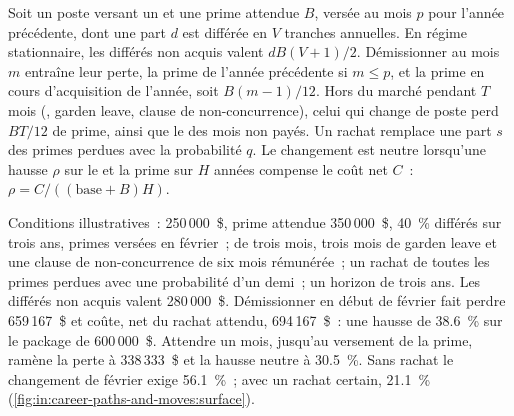 \begin{method}\label{met:in:career-paths-and-moves:move}
Soit un poste versant un  et une prime attendue $B$, versée au mois $p$ pour l'année précédente, dont une part $d$ est différée en $V$
tranches annuelles. En régime stationnaire, les différés non acquis valent $dB(V+1)/2$. Démissionner au mois $m$ entraîne leur perte,
la prime de l'année précédente si $m\le p$, et la prime en cours d'acquisition de l'année, soit $B(m-1)/12$. Hors du marché pendant $T$ mois
(, garden leave, clause de non-concurrence), celui qui change de poste perd $BT/12$ de prime, ainsi que le  des mois non payés. Un rachat
remplace une part $s$ des primes perdues avec la probabilité $q$. Le changement est neutre lorsqu'une hausse $\rho$ sur le  et la prime
sur $H$ années compense le coût net $C$~: $\rho=C/((\text{base}+B)H)$.
\end{method}

\begin{example}\label{ex:in:career-paths-and-moves:move}
Conditions illustratives~:  250\,000~\$, prime attendue 350\,000~\$, 40~\% différés sur trois ans, primes versées en février~;
 de trois mois, trois mois de garden leave et une clause de non-concurrence de six mois rémunérée~; un rachat de toutes les primes perdues avec
une probabilité d'un demi~; un horizon de trois ans. Les différés non acquis valent 280\,000~\$. Démissionner en début de février
fait perdre 659\,167~\$ et coûte, net du rachat attendu, 694\,167~\$~: une hausse de 38.6~\% sur le package de 600\,000~\$. Attendre
un mois, jusqu'au versement de la prime, ramène la perte à 338\,333~\$ et la hausse neutre à 30.5~\%. Sans rachat
le changement de février exige 56.1~\%~; avec un rachat certain, 21.1~\% (\cref{fig:in:career-paths-and-moves:surface}).
\end{example}

